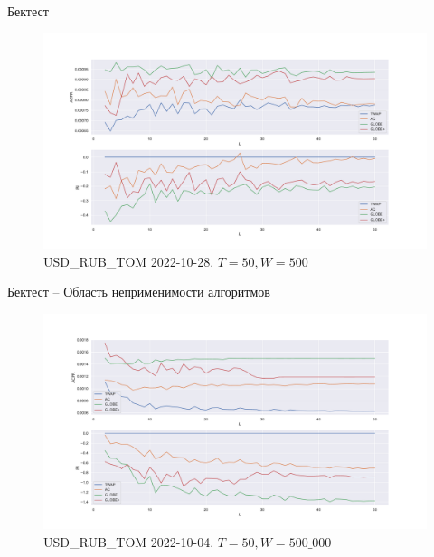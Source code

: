 \documentclass[aspectratio=169]{beamer}
\begin{document}
        \begin{frame}{Бектест}
        
            \begin{figure}  
                \centering
                \includegraphics[width=0.83\linewidth]{USD_RUB_T+1 2022-10-28 T = 50 W = 500}
                \caption{USD\_RUB\_TOM 2022-10-28. $T = 50, W = 500$}
            \end{figure}

        \end{frame}


        \begin{frame}{Бектест -- Область неприменимости алгоритмов}
            \begin{figure}  
                \centering
                \includegraphics[width=0.83\linewidth]{USD_RUB_T+1 2022-10-04 T = 50 W = 500, x10000}
                \caption{USD\_RUB\_TOM 2022-10-04. $T = 50, W = 500\_000$}
            \end{figure}
            
        \end{frame}
\end{document}

